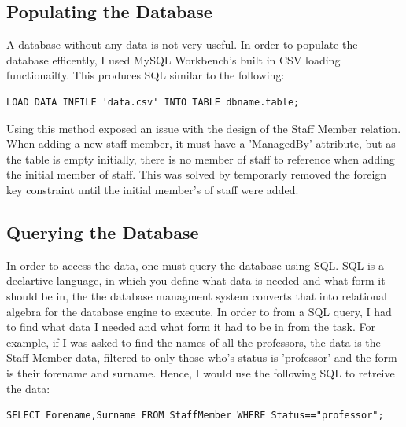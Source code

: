 \documentclass[12pt]{article}
\begin{document}
\subsection{Populating the Database}
A database without any data is not very useful.
In order to populate the database efficently, I used MySQL Workbench's built in CSV loading functionailty.
This produces SQL similar to the following:
\begin{lstlisting}
LOAD DATA INFILE 'data.csv' INTO TABLE dbname.table;
\end{lstlisting}
Using this method exposed an issue with the design of the Staff Member relation.
When adding a new staff member, it must have a 'ManagedBy' attribute, but as the table is empty initially, there is no member of staff to reference when adding the initial member of staff.
This was solved by temporarly removed the foreign key constraint until the initial member's of staff were added.

\subsection{Querying the Database}
In order to access the data, one must query the database using SQL.
SQL is a declartive language, in which you define what data is needed and what form it should be in, the the database managment system converts that into relational algebra for the database engine to execute.
In order to from a SQL query, I had to find what data I needed and what form it had to be in from the task.
For example, if I was asked to find the names of all the professors, the data is the Staff Member data, filtered to only those who's status is 'professor' and the form is their forename and surname.
Hence, I would use the following SQL to retreive the data:
\begin{lstlisting}
SELECT Forename,Surname FROM StaffMember WHERE Status=="professor";
\end{lstlisting}
\end{document}
